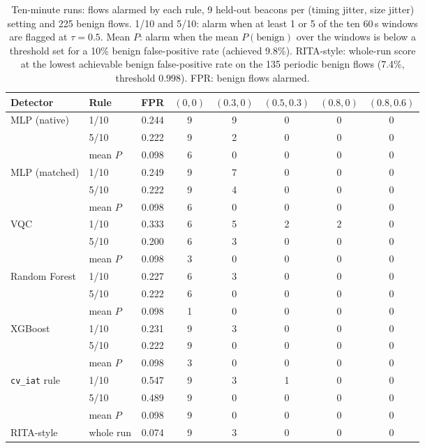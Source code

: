 \documentclass[preprint,12pt]{elsarticle}
\begin{document}
\begin{table}[htbp]
\centering
\caption{Ten-minute runs: flows alarmed by each rule, 9 held-out beacons per (timing jitter, size
jitter) setting and 225 benign flows. 1/10 and 5/10: alarm when at least 1 or 5 of the ten 60\,s windows
are flagged at $\tau=0.5$. Mean $P$: alarm when the mean $P(\text{benign})$ over the windows is below a
threshold set for a 10\% benign false-positive rate (achieved 9.8\%). RITA-style: whole-run score at the
lowest achievable benign false-positive rate on the 135 periodic benign flows (7.4\%, threshold
$0.998$). FPR: benign flows alarmed.}
\label{tab:long}
\setlength{\tabcolsep}{3pt}\scriptsize
\begin{tabular}{llcccccc}
\toprule
Detector & Rule & FPR & $(0,0)$ & $(0.3,0)$ & $(0.5,0.3)$ & $(0.8,0)$ & $(0.8,0.6)$ \\
\midrule
MLP (native)  & 1/10   & 0.244 & 9 & 9 & 0 & 0 & 0 \\
              & 5/10   & 0.222 & 9 & 2 & 0 & 0 & 0 \\
              & mean $P$ & 0.098 & 6 & 0 & 0 & 0 & 0 \\
MLP (matched) & 1/10   & 0.249 & 9 & 7 & 0 & 0 & 0 \\
              & 5/10   & 0.222 & 9 & 4 & 0 & 0 & 0 \\
              & mean $P$ & 0.098 & 6 & 0 & 0 & 0 & 0 \\
VQC           & 1/10   & 0.333 & 6 & 5 & 2 & 2 & 0 \\
              & 5/10   & 0.200 & 6 & 3 & 0 & 0 & 0 \\
              & mean $P$ & 0.098 & 3 & 0 & 0 & 0 & 0 \\
Random Forest & 1/10   & 0.227 & 6 & 3 & 0 & 0 & 0 \\
              & 5/10   & 0.222 & 6 & 0 & 0 & 0 & 0 \\
              & mean $P$ & 0.098 & 1 & 0 & 0 & 0 & 0 \\
XGBoost       & 1/10   & 0.231 & 9 & 3 & 0 & 0 & 0 \\
              & 5/10   & 0.222 & 9 & 0 & 0 & 0 & 0 \\
              & mean $P$ & 0.098 & 3 & 0 & 0 & 0 & 0 \\
\texttt{cv\_iat} rule & 1/10 & 0.547 & 9 & 3 & 1 & 0 & 0 \\
              & 5/10   & 0.489 & 9 & 0 & 0 & 0 & 0 \\
              & mean $P$ & 0.098 & 9 & 0 & 0 & 0 & 0 \\
RITA-style    & whole run & 0.074 & 9 & 3 & 0 & 0 & 0 \\
\bottomrule
\end{tabular}
\end{table}
\end{document}
